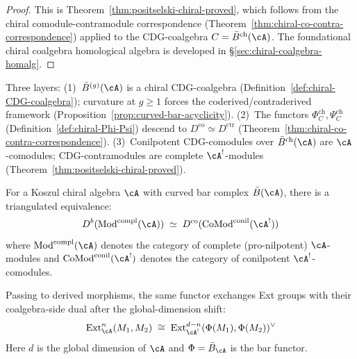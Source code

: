 \begin{proof}
This is Theorem~\ref{thm:positselski-chiral-proved}, which follows
from the chiral comodule-contramodule correspondence
(Theorem~\ref{thm:chiral-co-contra-correspondence}) applied to the
CDG-coalgebra $C = \bar{B}^{\mathrm{ch}}(\cA)$.  The foundational
chiral coalgebra homological algebra is developed in
\S\ref{sec:chiral-coalgebra-homalg}.
\end{proof}

\begin{remark}
\label{rem:positselski-proof-strategy}
Three layers: (1)~$\bar{B}^{(g)}(\cA)$ is a chiral CDG-coalgebra (Definition~\ref{def:chiral-CDG-coalgebra}); curvature at $g \geq 1$ forces the coderived/contraderived framework (Proposition~\ref{prop:curved-bar-acyclicity}).  (2)~The functors $\Phi_C^{\mathrm{ch}}, \Psi_C^{\mathrm{ch}}$ (Definition~\ref{def:chiral-Phi-Psi}) descend to $D^{\mathrm{co}} \simeq D^{\mathrm{ctr}}$ (Theorem~\ref{thm:chiral-co-contra-correspondence}).  (3)~Conilpotent CDG-comodules over $\bar{B}^{\mathrm{ch}}(\cA)$ are $\cA$-comodules; CDG-contramodules are complete $\cA^!$-modules (Theorem~\ref{thm:positselski-chiral-proved}).
\end{remark}

\begin{theorem}
\label{thm:full-derived-module-equiv}
For a Koszul chiral algebra $\cA$ with curved bar complex
$\bar{B}(\cA)$, there is a triangulated equivalence:
\begin{equation}\label{eq:full-derived-equiv}
D^b(\mathrm{Mod}^{\mathrm{compl}}(\cA))
\;\simeq\;
D^{\mathrm{co}}(\mathrm{CoMod}^{\mathrm{conil}}(\cA^!))
\end{equation}
where $\mathrm{Mod}^{\mathrm{compl}}(\cA)$ denotes the category
of complete \textup{(}pro-nilpotent\textup{)} $\cA$-modules
and $\mathrm{CoMod}^{\mathrm{conil}}(\cA^!)$ denotes the
category of conilpotent $\cA^!$-comodules.

Passing to derived morphisms, the same functor exchanges Ext groups with
their coalgebra-side dual after the global-dimension shift:
\begin{equation}\label{eq:ext-duality-full}
\mathrm{Ext}^n_{\cA}(M_1, M_2)
\;\cong\;
\mathrm{Ext}^{d-n}_{\cA^!}(\Phi(M_1), \Phi(M_2))^{\vee}
\end{equation}
Here $d$ is the global dimension of $\cA$ and
$\Phi = \bar{B}_{\cA}$ is the bar functor.
\end{theorem}

